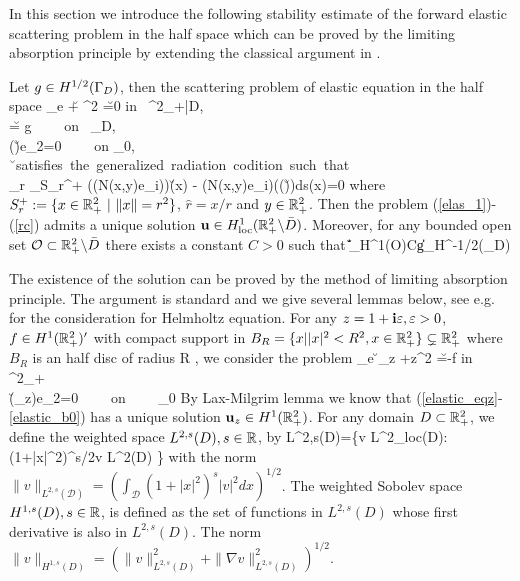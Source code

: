 \documentclass[12pt]{iopart}
\begin{document}
In this section we introduce the following stability estimate of the forward elastic scattering problem in the half space which can be proved by the limiting absorption principle by extending the classical argument in \cite{leis,wilcox1975,Yves1988}.
\begin{thm} \label{elastic_eq2}
	Let $g \in H^{1/2}(\Gamma_D)$, then the scattering problem of elastic equation in the half space
	\be
	\Delta_e \u + \omega^2 \u =0 \qquad\mbox{\rm in } \R^2_+\bks \bar{D}, \label{elas_1}\ \ \
	\\ \u= g \ \ \ \ \mbox{\rm on } \Ga_D, \label{elas_bd} \\
	\sigma(\u)e_2=0 \ \ \ \ \mbox{\rm on} \Ga_0, \label{elas_b0} \\
	\u \ \mbox{satisfies the generalized radiation codition\cite{Guzina2006} such that} \nn \\\label{rc}
	\lim_{r\to\infty}  \int_{S_r^+} (\sigma(N(x,y)e_i))\cdot \u(x) - (N(x,y)e_i)\cdot (\sigma(\u)\hat{r})ds(x)=0
	\ee
	where $S_r^+:=\{x\in \mathbb{R}^2_+ \ | \ \|x\|=r^2\}$, $\hat{r}=x/r$ and $y\in \mathbb{R}_+^2$. Then the problem (\ref{elas_1})-(\ref{rc})
	admits a unique solution $\mathbf{u} \in H^{1}_{\rm loc}(\mathbb{R}^2_+ \backslash \bar D)$. Moreover, for any bounded open set $\mathcal O\subset \mathbb{R}^2_+\backslash\bar D$ there exists a constant $C>0$ such that
	\be \label{elas_ineq}
	\|\u\|_{H^{1}(\mathcal O)}\le C\|g\|_{H^{-1/2}(\Ga_D)}
	\ee
\end{thm}
The existence of the solution can be proved by the method of limiting absorption principle. The argument is standard and we give several lemmas below, see e.g. \cite{leis} for the consideration for Helmholtz equation. For any $z=1+\mathbf{i}\varepsilon,\varepsilon>0$, $f\in H^{1}(\mathbb{R}^2_+)'$ with compact support in $B_R=\{x||x|^2<R^2,x\in\mathbb{R}^2_+\}\subsetneq\mathbb{R}_+^2$ where $B_R$ is an half disc of radius R , we consider the problem
\be \label{elastic_eqz}
\Delta_e \u_z +z\omega^2 \u =-f \qquad\mbox{\rm in } \R^2_+ \\
\sigma(\u_z)e_2=0 \ \ \ \ \mbox{\rm on} \ \ \ \  \Ga_0 \label{elastic_b0}
\ee
By Lax-Milgrim lemma we know that (\ref{elastic_eqz}-\ref{elastic_b0}) has a unique solution $\mathbf{u}_z\in H^1(\mathbb{R}^2_+)$. For any domain $ D \subset \mathbb{R}^2_+$, we define the weighted space $L^{2,s}(D),s \in \mathbb{R}$, by
\ben
L^{2,s}(D)=\{v \in L^2_{\rm loc}(D): (1+|x|^2)^{s/2}v \in L^2(D) \}
\een
with the norm $\| v \|_{ L^{2,s}(\mathcal D)} = (\int_{\mathcal D}(1+|x|^2)^{s}|v|^2 dx )^{1/2}$. The weighted Sobolev space $H^{1,s}(D),s \in \mathbb{R}$,
is defined as the set of functions in $L^{2,s}(D)$ whose first derivative is also in $L^{2,s}(D)$. The norm
$\| v \|_{ H^{1,s}(D)} = (\| v \|^2_{ L^{2,s} (D)} + \| \nabla v \|^2_{ L^{2,s}(D)})^{1/2}$.
\end{document}
